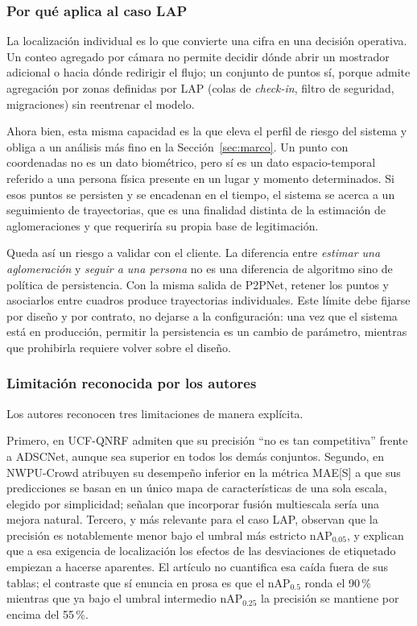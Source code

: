 \subsubsection*{Por qué aplica al caso LAP}

La localización individual es lo que convierte una cifra en una decisión
operativa. Un conteo agregado por cámara no permite decidir dónde abrir
un mostrador adicional o hacia dónde redirigir el flujo; un conjunto de
puntos sí, porque admite agregación por zonas definidas por LAP (colas de
\emph{check-in}, filtro de seguridad, migraciones) sin reentrenar el
modelo.

Ahora bien, esta misma capacidad es la que eleva el perfil de riesgo del
sistema y obliga a un análisis más fino en la Sección~\ref{sec:marco}. Un
punto con coordenadas no es un dato biométrico, pero sí es un dato
espacio-temporal referido a una persona física presente en un lugar y
momento determinados. Si esos puntos se persisten y se encadenan en el
tiempo, el sistema se acerca a un seguimiento de trayectorias, que es una
finalidad distinta de la estimación de aglomeraciones y que requeriría su
propia base de legitimación.

Queda así un riesgo a validar con el cliente. La diferencia entre
\emph{estimar una aglomeración} y \emph{seguir a una persona} no es una
diferencia de algoritmo sino de política de persistencia. Con la misma
salida de P2PNet, retener los puntos y asociarlos entre cuadros produce
trayectorias individuales. Este límite debe fijarse por diseño y por
contrato, no dejarse a la configuración: una vez que el sistema está en
producción, permitir la persistencia es un cambio de parámetro, mientras
que prohibirla requiere volver sobre el diseño.

\subsubsection*{Limitación reconocida por los autores}

Los autores reconocen tres limitaciones de manera explícita.

Primero, en UCF-QNRF admiten que su precisión \enquote{no es tan
competitiva} frente a ADSCNet, aunque sea superior en todos los demás
conjuntos. Segundo, en NWPU-Crowd atribuyen su desempeño inferior en la
métrica MAE[S] a que sus predicciones se basan en un único mapa de
características de una sola escala, elegido por simplicidad; señalan que
incorporar fusión multiescala sería una mejora natural. Tercero, y más
relevante para el caso LAP, observan que la precisión es notablemente
menor bajo el umbral más estricto nAP$_{0.05}$, y explican que a esa
exigencia de localización los efectos de las desviaciones de etiquetado
empiezan a hacerse aparentes. El artículo no cuantifica esa caída fuera
de sus tablas; el contraste que sí enuncia en prosa es que el
nAP$_{0.5}$ ronda el 90\,\% mientras que ya bajo el umbral intermedio
nAP$_{0.25}$ la precisión se mantiene por encima del 55\,\%.


